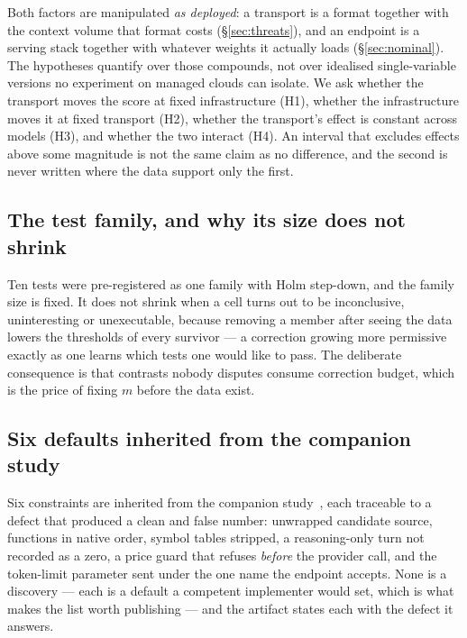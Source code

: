 Both factors are manipulated \emph{as deployed}: a transport is a format together with the context volume
that format costs (\S\ref{sec:threats}), and an endpoint is a serving stack together with whatever weights
it actually loads (\S\ref{sec:nominal}). The hypotheses quantify over those compounds, not over idealised
single-variable versions no experiment on managed clouds can isolate. We ask whether the transport moves
the score at fixed infrastructure (H1), whether the infrastructure moves it at fixed transport (H2),
whether the transport's effect is constant across models (H3), and whether the two interact (H4). An
interval that excludes effects above some magnitude is not the same claim as no difference, and the second is never
written where the data support only the first.

\subsection{The test family, and why its size does not shrink}
\label{sec:family}

Ten tests were pre-registered as one family with Holm step-down, and the family size is fixed. It does not
shrink when a cell turns out to be inconclusive, uninteresting or unexecutable, because removing a member
after seeing the data lowers the thresholds of every survivor --- a correction growing more permissive
exactly as one learns which tests one would like to pass. The deliberate consequence is that contrasts
nobody disputes consume correction budget, which is the price of fixing $m$ before the data exist.

\subsection{Six defaults inherited from the companion study}

Six constraints are inherited from the companion study~\citep{companion2026baseline}, each traceable to
a defect that produced a clean and false number: unwrapped candidate source, functions in native order, symbol tables stripped,
a reasoning-only turn not recorded as a zero, a price guard that refuses \emph{before} the provider
call, and the token-limit parameter sent under the one name the endpoint accepts. None is a discovery
--- each is a default a competent implementer would set, which is what makes the list worth publishing
--- and the artifact states each with the defect it answers.
